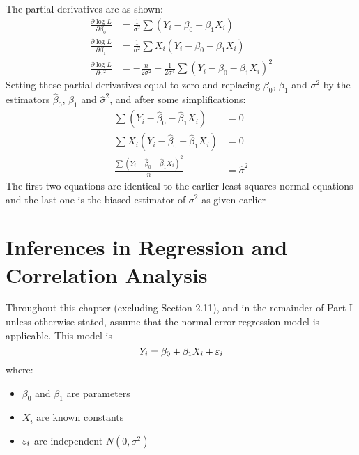 \begin{itemize}
The partial derivatives are as shown: $$ \begin{aligned} \frac{\partial \log L}{\partial \beta_0} &= \frac{1}{\sigma^2} \sum (Y_i - \beta_0 - \beta_1X_i) \\ \frac{\partial \log L}{\partial \beta_1} &= \frac{1}{\sigma^2} \sum X_i(Y_i - \beta_0 - \beta_1X_i) \\ \frac{\partial \log L}{\partial \sigma^2} &= -\frac{n}{2\sigma^2} + \frac{1}{2\sigma^4}\sum (Y_i - \beta_0 - \beta_1X_i)^2 \end{aligned} $$  Setting these partial derivatives equal to zero and replacing $\beta_0$, $\beta_1$ and $\sigma^2$ by the estimators $\hat{\beta}_0$, $\hat{\beta}_1$ and $\hat{\sigma}^2$, and after some simplifications: $$ \begin{aligned} \sum (Y_i - \hat{\beta}_0 - \hat{\beta}_1X_i) &= 0 \\ \sum X_i(Y_i - \hat{\beta}_0 - \hat{\beta}_1X_i) &= 0 \\ \frac{\sum (Y_i - \hat{\beta}_0 - \hat{\beta}_1X_i)^2}{n} &= \hat{\sigma}^2 \end{aligned} $$ 
The first two equations are identical to the earlier least squares normal equations and the last one is the biased estimator of $\sigma^2$ as given earlier
\end{itemize}


\section{Inferences in Regression and Correlation Analysis}
Throughout this chapter (excluding Section 2.11), and in the remainder of Part I unless otherwise stated, assume that the normal error regression model is applicable. This model is
$$ Y_i = \beta_0 + \beta_1X_i + \varepsilon_i $$ where: \begin{itemize}[label={}]
\item $\beta_0$ and $\beta_1$ are parameters 
\item $X_i$ are known constants 
\item $\varepsilon_i$ are independent $N(0, \sigma^2)$ \end{itemize} 

